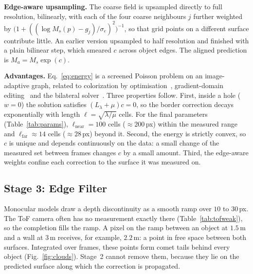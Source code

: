 \documentclass[conference]{IEEEtran}
\newcommand{\Dp}{M}            %
\begin{document}
\textbf{Edge-aware upsampling.} The coarse field is upsampled directly to full
resolution, bilinearly, with each of the four coarse neighbours \(j\) further
weighted by \(\big(1+((\log\Dp_s(p)-g_j)/\sigma_e)^2\big)^{-1}\), so that grid
points on a different surface contribute little. An earlier version upsampled
to half resolution and finished with a plain bilinear step, which smeared
\(c\) across object edges. The aligned prediction is
\(\Dp_a=\Dp_s\exp(c)\).

\textbf{Advantages.} Eq.~\eqref{eq:energy} is a screened Poisson problem on an
image-adaptive graph, related to colorization by
optimisation~\cite{levin2004colorization}, gradient-domain
editing~\cite{perez2003poisson} and the bilateral
solver~\cite{barron2016bilateral}. Three properties follow. First, inside a
hole (\(w=0\)) the solution satisfies \((L_\lambda+\mu)c=0\), so the border
correction decays exponentially with length \(\ell=\sqrt{\lambda/\mu}\) cells.
For the final parameters (Table~\ref{tab:params}),
\(\ell_{\mathrm{near}}=100\) cells (\(\approx\!200\,\)px) within the measured
range and \(\ell_{\mathrm{far}}\approx14\) cells (\(\approx\!28\,\)px) beyond
it. Second, the energy is strictly convex, so \(c\) is unique and depends
continuously on the data: a small change of the measured set between frames
changes \(c\) by a small amount. Third, the edge-aware weights confine each
correction to the surface it was measured on.

\subsection{Stage 3: Edge Filter}
\label{sec:edgefilter}
Monocular models draw a depth discontinuity as a smooth ramp over \(10\) to
\(30\,\)px. The ToF camera often has no measurement exactly there
(Table~\ref{tab:tofweak}), so the completion fills the ramp. A pixel on the
ramp between an object at \(1.5\,\)m and a wall at \(3\,\)m receives, for
example, \(2.2\,\)m: a point in free space between both surfaces. Integrated
over frames, these points form comet tails behind every object
(Fig.~\ref{fig:clouds}). Stage~2 cannot remove them, because they lie on the
predicted surface along which the correction is propagated.
\end{document}

